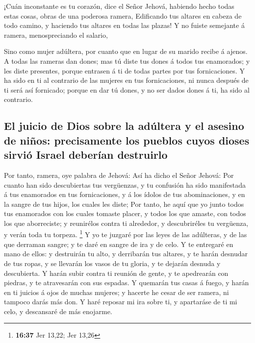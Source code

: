  ¡Cuán inconstante es tu corazón, dice el Señor Jehová,
habiendo hecho todas estas cosas, obras de una poderosa ramera,
 Edificando tus altares en cabeza de todo camino, y
haciendo tus altares en todas las plazas! Y no fuiste semejante á
ramera, menospreciando el salario,

 Sino como mujer adúltera, por cuanto que en lugar de su
marido recibe á ajenos.  A todas las rameras dan dones; mas
tú diste tus dones á todos tus enamorados; y les diste presentes, porque
entrasen á ti de todas partes por tus fornicaciones.  Y ha
sido en ti al contrario de las mujeres en tus fornicaciones, ni nunca
después de ti será así fornicado; porque en dar tú dones, y no ser dados
dones á ti, ha sido al contrario.

\hypertarget{el-juicio-de-dios-sobre-la-aduxfaltera-y-el-asesino-de-niuxf1os-precisamente-los-pueblos-cuyos-dioses-sirviuxf3-israel-deberuxedan-destruirlo}{%
\subsection{El juicio de Dios sobre la adúltera y el asesino de niños:
precisamente los pueblos cuyos dioses sirvió Israel deberían
destruirlo}\label{el-juicio-de-dios-sobre-la-aduxfaltera-y-el-asesino-de-niuxf1os-precisamente-los-pueblos-cuyos-dioses-sirviuxf3-israel-deberuxedan-destruirlo}}

 Por tanto, ramera, oye palabra de Jehová: 
Así ha dicho el Señor Jehová: Por cuanto han sido descubiertas tus
vergüenzas, y tu confusión ha sido manifestada á tus enamorados en tus
fornicaciones, y á los ídolos de tus abominaciones, y en la sangre de
tus hijos, los cuales les diste;  Por tanto, he aquí que yo
junto todos tus enamorados con los cuales tomaste placer, y todos los
que amaste, con todos los que aborreciste; y reunirélos contra ti
alrededor, y descubriréles tu vergüenza, y verán toda tu torpeza.
\footnote{\textbf{16:37} Jer 13,22; Jer 13,26}  Y yo te
juzgaré por las leyes de las adúlteras, y de las que derraman sangre; y
te daré en sangre de ira y de celo.  Y te entregaré en mano
de ellos: y destruirán tu alto, y derribarán tus altares, y te harán
desnudar de tus ropas, y se llevarán los vasos de tu gloria, y te
dejarán desnuda y descubierta.  Y harán subir contra ti
reunión de gente, y te apedrearán con piedras, y te atravesarán con sus
espadas.  Y quemarán tus casas á fuego, y harán en ti
juicios á ojos de muchas mujeres; y hacerte he cesar de ser ramera, ni
tampoco darás más don.  Y haré reposar mi ira sobre ti, y
apartaráse de ti mi celo, y descansaré de más enojarme.

